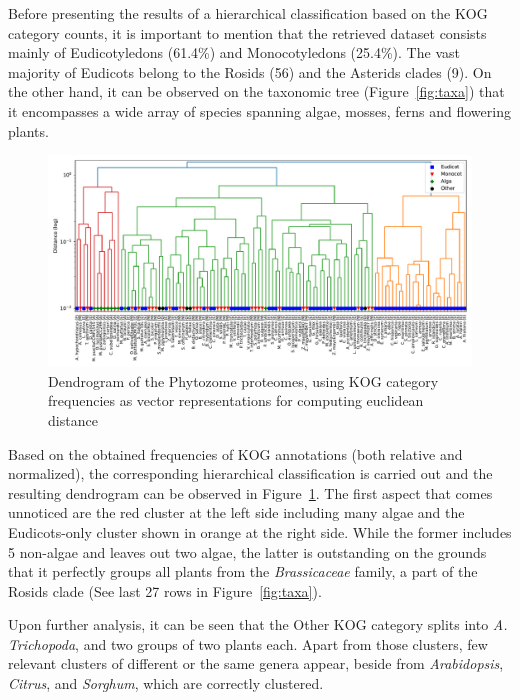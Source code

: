 Before presenting the results of a hierarchical 
classification based on the KOG category counts, it is 
important to mention that the retrieved dataset consists 
mainly of Eudicotyledons (61.4\%) and Monocotyledons (25.4\%). 
The vast majority of Eudicots belong to the Rosids (56) 
and the Asterids clades (9). On the other hand, it can be 
observed on the taxonomic tree (Figure~\ref{fig:taxa}) 
that it encompasses a wide array of species 
spanning algae, mosses, ferns and flowering plants.

\begin{figure}[htp!]
\centering
\includegraphics[width=1.1\textwidth]{figures/dendrogram_ward}
\caption{Dendrogram of the Phytozome proteomes, using KOG 
category frequencies as vector representations for 
computing euclidean distance}
\label{fig:dendrogram}
\end{figure}

Based on the obtained frequencies of KOG annotations (both 
relative and normalized), the corresponding hierarchical 
classification is carried out and the resulting 
dendrogram can be observed in Figure~\ref{fig:dendrogram}.
The first aspect that comes unnoticed are the red cluster at 
the left side including many algae and the 
Eudicots-only cluster shown in orange at the right side. 
While the former includes 5 non-algae and leaves out 
two algae, the latter is outstanding on the grounds 
that it perfectly groups all plants from the 
\emph{Brassicaceae} family, a part of the Rosids clade (See 
last 27 rows in Figure~\ref{fig:taxa}).

Upon further analysis, it can be seen that the Other KOG 
category splits into \emph{A. Trichopoda}, and two groups 
of two plants each. Apart from those clusters, few relevant 
clusters of different or the same genera appear, beside from 
\emph{Arabidopsis}, \emph{Citrus}, and \emph{Sorghum}, which 
are correctly clustered.

